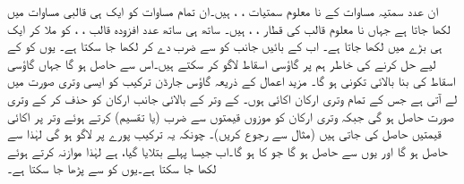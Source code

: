 ان  عدد سمتیہ  مساوات کے نا معلوم سمتیات ، ،  ہیں۔ان تمام مساوات کو ایک ہی قالبی مساوات  میں لکھا جاتا ہے جہاں نا معلوم قالب  کی  قطار ، ،  ہیں۔ ساتھ ہی ساتھ  عدد افزودہ قالب ، ،   کو ملا کر ایک ہی   بڑے   میں لکھا جاتا ہے۔ اب  کے بائیں جانب کو  سے ضرب دے کر  لکھا جا سکتا ہے۔  یوں  کو  کے لیے حل کرنے کی خاطر ہم  پر گاؤسی اسقاط لاگو  کر سکتے ہیں۔اس سے  حاصل ہو گا جہاں گاؤسی اسقاط کی بنا  بالائی تکونی ہو گا۔ مزید اعمال کے ذریعہ گاؤس جارڈن ترکیب  کو ایسی وتری صورت میں لے آتی ہے جس کے تمام وتری ارکان اکائی  ہوں۔ کے وتر کے بالائی جانب ارکان کو حذف کر کے وتری صورت حاصل ہو گی جبکہ وتری ارکان کو موزوں قیمتوں سے ضرب (یا تقسیم) کرتے ہوئے وتر پر اکائی قیمتیں حاصل کی جاتی ہیں (مثال  سے رجوع کریں)۔ چونکہ یہ ترکیب پورے  پر لاگو ہو گی لہٰذا  سے  حاصل ہو گا اور یوں  سے  حاصل ہو گا جو  کا  ہو گا۔اب جیسا پہلے بتلایا گیا،  ہے لہٰذا موازنہ کرتے ہوئے  لکھا جا سکتا ہے۔یوں  کو  سے پڑھا جا سکتا ہے۔

